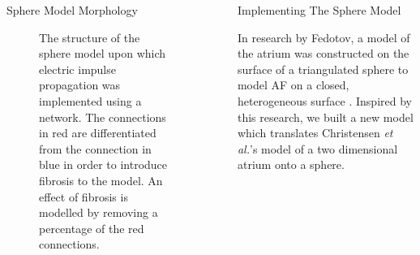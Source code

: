 \documentclass[final,hyperref={pdfpagelabels=false}]{beamer}
\begin{document}
\begin{frame}[t]
\begin{columns}[t]
\begin{column}{.465\textwidth}
\begin{block}{Sphere Model Morphology}
\begin{figure}
\begin{columns}
\begin{column}{.67\textwidth}
\end{column}
\hspace{-6em}
\begin{column}{.3\textwidth}
\caption{The structure of the sphere model upon which electric impulse propagation was implemented using a network. The connections in red are differentiated from the connection in blue in order to introduce fibrosis to the model. An effect of fibrosis is modelled by removing a percentage of the red connections. }

\end{column}
\end{columns}
\end{figure}

\end{block}




\end{column} %

\begin{column}{.03\textwidth}\end{column} %
 
\begin{column}{.465\textwidth} %









\begin{block}{Implementing The Sphere Model}




In research by Fedotov, a model of the atrium was constructed on the surface of a triangulated sphere to model AF on a closed, heterogeneous surface \cite{Fedotov}. Inspired by this research, we built a new model which translates Christensen \emph{et al.}'s model of a two dimensional atrium onto a sphere.




\end{block}
\end{column}
\end{columns}
\end{frame}
\end{document}
